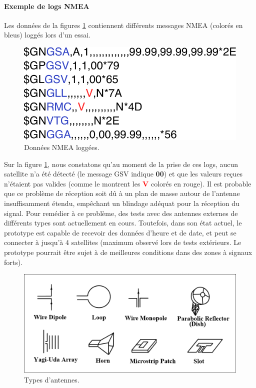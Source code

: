 \paragraph*{Exemple de logs NMEA}

Les données de la figures \ref{fig:donnees-nmea} contiennent différents messages NMEA (colorés en bleus) loggés lors d'un essai.

\begin{figure}[!h]
	\centering
	\includegraphics[width=0.5\linewidth]{../figures/code/donnees-nmea}
	\caption{Données NMEA loggées.}
	\label{fig:donnees-nmea}
\end{figure}

Sur la figure \ref{fig:donnees-nmea}, nous constatons qu'au moment de la prise de ces logs, aucun satellite n'a été détecté (le message GSV indique \textbf{00}) et que les valeurs reçues n'étaient pas valides (comme le montrent les \textcolor{red}{\textbf{V}} colorés en rouge). Il est probable que ce problème de réception soit dû à un plan de masse autour de l'antenne insuffisamment étendu, empêchant un blindage adéquat pour la réception du signal. Pour remédier à ce problème, des tests avec des antennes externes de différents types sont actuellement en cours. Toutefois, dans son état actuel, le prototype est capable de recevoir des données d'heure et de date, et peut se connecter à jusqu'à 4 satellites (maximum observé lors de tests extérieurs. Le prototype pourrait être sujet à de meilleures conditions dans des zones à signaux forts).

\begin{figure}[h]
	\centering
	\includegraphics[width=.61\linewidth]{../figures/code/antenna-types}
	\caption{Types d'antennes.}
	\label{fig:antenna-types}
\end{figure}


